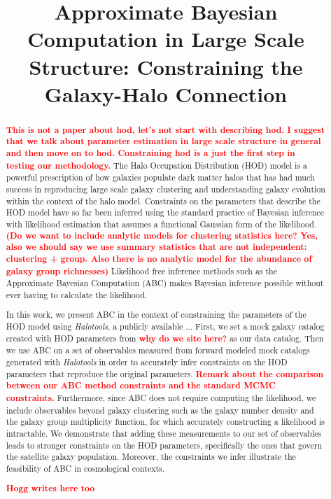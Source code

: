\documentclass[12pt, preprint]{aastex}
\newcommand{\todo}[1]{{\bf \textcolor{red}{ #1}}}
\begin{document}
\title{Approximate Bayesian Computation in Large Scale Structure: Constraining the Galaxy-Halo Connection}
\begin{abstract}
\todo{This is not a paper about hod, let's not start with describing hod. I suggest that we talk about parameter estimation in large scale structure in general and then move on to hod. Constraining hod is a just the first step in testing our methodology.} The Halo Occupation Distribution (HOD) model is a powerful prescription of how galaxies
populate dark matter halos that has had much success in reproducing large scale galaxy
clustering and understanding galaxy evolution within the context of the halo model.
Constraints on the parameters that describe the HOD model have so far been inferred using 
the standard practice of Bayesian inference with likelihood estimation that assumes a
functional Gaussian form of the likelihood.\todo{(Do we want to include analytic models for clustering statistics here? Yes, also we should say we use summary statistics that are not independent: clustering + group. Also there is no analytic model for the abundance of galaxy group richnesses)}  %
Likelihood free inference methods such as the
Approximate Bayesian Computation (ABC) makes Bayesian inference possible without ever 
having to calculate the likelihood. 

In this work, we present ABC in the context of constraining the parameters of the HOD model
using {\it Halotools}, a publicly available ... First, we set a mock galaxy catalog created
with HOD parameters from \cite{Zheng:2007aa} \todo{why do we site here?} as our data catalog. Then we use ABC on a set 
of observables measured from forward modeled mock catalogs generated with {\it Halotools} 
in order to accurately infer constraints on the HOD parameters that 
reproduce the original parameters. \todo{Remark about the comparison between our ABC 
method constraints and the standard MCMC constraints.} Furthermore, since ABC does 
not require computing the likelihood, we include observables beyond galaxy clustering 
such as the galaxy number density and the galaxy group multiplicity function, for which
accurately constructing a likelihood is intractable. 
We demonstrate that adding these measurements to our set of observables leads to stronger
constraints on the HOD parameters, specifically the ones that govern the satellite galaxy
population. Moreover, the constraints we infer illustrate the feasibility of ABC in 
cosmological contexts.

\todo{Hogg writes here too}

\end{abstract}
\end{document}
